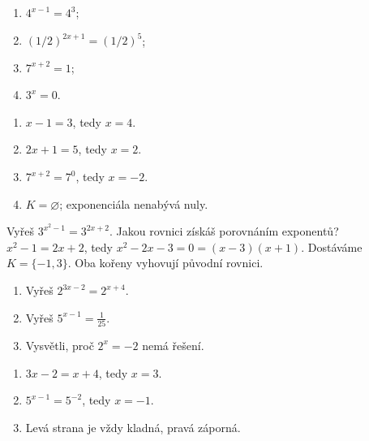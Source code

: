 \documentclass[11pt,a4paper]{article}
\begin{document}
\begin{zadaniReseniBox}[title={Samostatná práce 1}]
\begin{enumerate}[label=\alph*)]
\item $4^{x-1}=4^3$;
\item $(1/2)^{2x+1}=(1/2)^5$;
\item $7^{x+2}=1$;
\item $3^{x}=0$.
\end{enumerate}
\tcblower
\begin{enumerate}[label=\alph*)]
\item $x-1=3$, tedy $x=4$.
\item $2x+1=5$, tedy $x=2$.
\item $7^{x+2}=7^0$, tedy $x=-2$.
\item $K=\varnothing$; exponenciála nenabývá nuly.
\end{enumerate}
\end{zadaniReseniBox}
\begin{zadaniReseniBox}[title={Rozšíření 1}]
Vyřeš $3^{x^2-1}=3^{2x+2}$. Jakou rovnici získáš porovnáním exponentů?
\tcblower
$x^2-1=2x+2$, tedy $x^2-2x-3=0=(x-3)(x+1)$. Dostáváme $K=\{-1,3\}$. Oba kořeny vyhovují původní rovnici.
\end{zadaniReseniBox}
\begin{zadaniReseniBox}[title={Domácí úkol}]
\begin{enumerate}[label=\alph*)]
\item Vyřeš $2^{3x-2}=2^{x+4}$.
\item Vyřeš $5^{x-1}=\frac1{25}$.
\item Vysvětli, proč $2^x=-2$ nemá řešení.
\end{enumerate}
\tcblower
\begin{enumerate}[label=\alph*)]
\item $3x-2=x+4$, tedy $x=3$.
\item $5^{x-1}=5^{-2}$, tedy $x=-1$.
\item Levá strana je vždy kladná, pravá záporná.
\end{enumerate}
\end{zadaniReseniBox}
\end{document}

